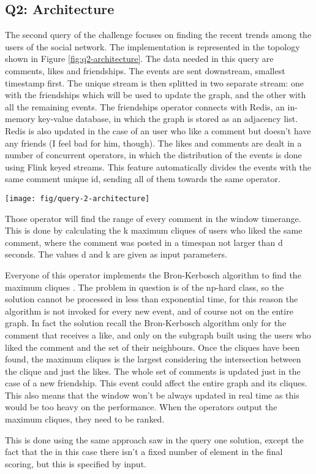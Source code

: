 \subsection{Q2: Architecture}
\label{sec:q2-architecture}

The second query of the challenge focuses on finding the recent trends among the users of the social network. The implementation is represented in the topology shown in Figure \ref{fig:q2-architecture}. The data needed in this query are comments, likes and friendships. The events are sent downstream, smallest timestamp first. The unique stream is then splitted in two separate stream: one with the friendships which will be used to update the graph, and the other with all the remaining events. The friendships operator connects with Redis, an in-memory key-value database, in which the graph is stored as an adjacency list. Redis is also updated in the case of an user who like a comment but doesn’t have any friends (I feel bad for him, though). The likes and comments are dealt in a number of concurrent operators, in which the distribution of the events is done using Flink keyed streams. This feature automatically divides the events with the same comment unique id, sending all of them towards the same operator.

\begin{figure*}[H!]
	\centering
	\texttt{[image: fig/query-2-architecture]}
	\caption{The topology of operators for Query 2.}
	\label{fig:q2-architecture}
\end{figure*}

Those operator will find the range of every comment in the window timerange. This is done by calculating the k maximum cliques of users who liked the same comment, where the comment was posted in a timespan not larger than d seconds. The values d and k are given as input parameters.

Everyone of this operator implements the Bron-Kerbosch algorithm to find the maximum cliques \cite{BronKerbosch1973}. The problem in question is of the np-hard class, so the solution cannot be processed in less than exponential time, for this reason the algorithm is not invoked for every new event, and of course not on the entire graph. In fact the solution recall the Bron-Kerbosch algorithm only for the comment that receives a like, and only on the subgraph built using the users who liked the comment and the set of their neighbours. Once the cliques have been found, the maximum cliques is the largest considering the intersection between the clique and just the likes. The whole set of comments is updated just in the case of a new friendship. This event could affect the entire graph and its cliques. This also means that the window won’t be always updated in real time as this would be too heavy on the performance. When the operators output the maximum cliques, they need to be ranked. 

This is done using the same approach saw in the query one solution, except the fact that the in this case there isn’t a fixed number of element in the final scoring, but this is specified by input.